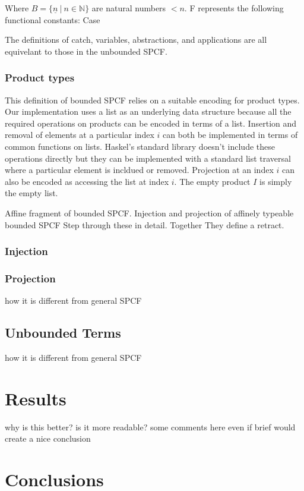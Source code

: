 \documentclass[12pt,a4paper]{report}
\theoremstyle{definition}
\theoremstyle{remark}
\begin{document}
Where $B = \{\underline{n}\ |\ n\in \mathbb{N}\}$ are natural numbers $ < n$.
F represents the following functional constants:
Case

The definitions of catch, variables, abstractions, and applications are all equivelant to those in the unbounded SPCF.

\subsection{Product types}
This definition of bounded SPCF relies on a suitable encoding for product types. Our implementation uses a list as an underlying data structure because all the required operations on products can be encoded in terms of a list. Insertion and removal of elements at a particular index $i$ can both be implemented in terms of common functions on lists. Haskel's standard library doesn't include these operations directly but they can be implemented with a standard list traversal where a particular element is incldued or removed. Projection at an index $i$ can also be encoded as accessing the list at index $i$. The empty product $I$ is simply the empty list.

Affine fragment of bounded SPCF.
Injection and projection of affinely typeable bounded SPCF
Step through these in detail. Together They define a retract. 
\subsection{Injection}



\subsection{Projection}

how it is different from general SPCF
\section{Unbounded Terms}
how it is different from general SPCF

\chapter{Results}
why is this better?
is it more readable?
some comments here even if brief would create a nice conclusion

\chapter{Conclusions}
\end{document}
